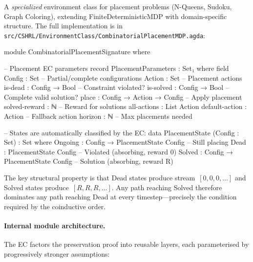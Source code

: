 \documentclass[9pt,a4paper]{article}
\newcommand{\fpath}[1]{\nolinkurl{#1}}
\theoremstyle{plain}
\theoremstyle{definition}
\theoremstyle{remark}
\begin{document}
A \emph{specialized} environment class for placement problems (N-Queens, Sudoku, Graph Coloring), extending FiniteDeterministicMDP with domain-specific structure. The full implementation is in \fpath{src/CSHRL/EnvironmentClass/CombinatorialPlacementMDP.agda}:

\begin{code}[hide]
module CombinatorialPlacementSignature where
\end{code}

\begin{code}
  -- Placement EC parameters
  record PlacementParameters : Set₁ where
    field
      Config : Set                      -- Partial/complete configurations
      Action : Set                      -- Placement actions
      is-dead   : Config → Bool         -- Constraint violated?
      is-solved : Config → Bool         -- Complete valid solution?
      place : Config → Action → Config  -- Apply placement
      solved-reward : ℕ                 -- Reward for solutions
      all-actions : List Action
      default-action : Action           -- Fallback action
      horizon : ℕ                       -- Max placements needed

  -- States are automatically classified by the EC:
  data PlacementState (Config : Set) : Set where
    Ongoing : Config → PlacementState Config  -- Still placing
    Dead    : PlacementState Config           -- Violated (absorbing, reward 0)
    Solved  : Config → PlacementState Config  -- Solution (absorbing, reward R)
\end{code}

\noindent The key structural property is that Dead states produce stream~$[0, 0, 0, \ldots]$ and Solved states produce~$[R, R, R, \ldots]$.  Any path reaching Solved therefore dominates any path reaching Dead at every timestep---precisely the condition required by the coinductive order.

\paragraph{Internal module architecture.}
The EC factors the preservation proof into reusable layers, each parameterised by progressively stronger assumptions:
\end{document}
